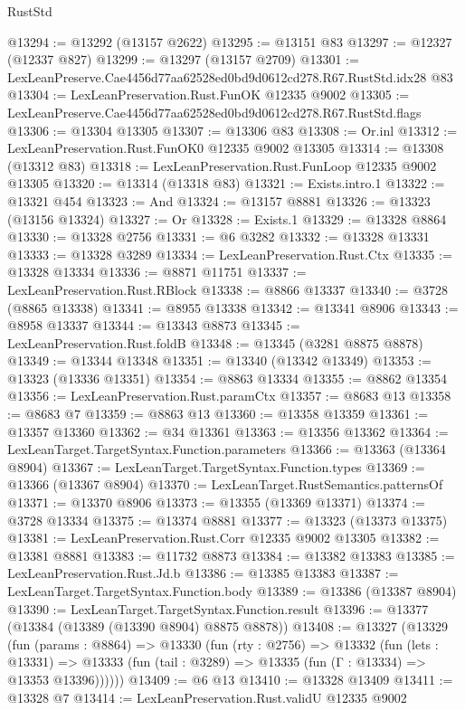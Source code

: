 \begin{lexlean}{RustStd}
\begin{coremodule}
@13294 := @13292 (@13157 @2622)
@13295 := @13151 @83
@13297 := @12327 (@12337 @827)
@13299 := @13297 (@13157 @2709)
@13301 := LexLeanPreserve.Cae4456d77aa62528ed0bd9d0612cd278.R67.RustStd.idx28 @83
@13304 := LexLeanPreservation.Rust.FunOK @12335 @9002
@13305 := LexLeanPreserve.Cae4456d77aa62528ed0bd9d0612cd278.R67.RustStd.flags
@13306 := @13304 @13305
@13307 := @13306 @83
@13308 := Or.inl
@13312 := LexLeanPreservation.Rust.FunOK0 @12335 @9002 @13305
@13314 := @13308 (@13312 @83)
@13318 := LexLeanPreservation.Rust.FunLoop @12335 @9002 @13305
@13320 := @13314 (@13318 @83)
@13321 := Exists.intro.{1}
@13322 := @13321 @454
@13323 := And
@13324 := @13157 @8881
@13326 := @13323 (@13156 @13324)
@13327 := Or
@13328 := Exists.{1}
@13329 := @13328 @8864
@13330 := @13328 @2756
@13331 := @6 @3282
@13332 := @13328 @13331
@13333 := @13328 @3289
@13334 := LexLeanPreservation.Rust.Ctx
@13335 := @13328 @13334
@13336 := @8871 @11751
@13337 := LexLeanPreservation.Rust.RBlock
@13338 := @8866 @13337
@13340 := @3728 (@8865 @13338)
@13341 := @8955 @13338
@13342 := @13341 @8906
@13343 := @8958 @13337
@13344 := @13343 @8873
@13345 := LexLeanPreservation.Rust.foldB
@13348 := @13345 (@3281 @8875 @8878)
@13349 := @13344 @13348
@13351 := @13340 (@13342 @13349)
@13353 := @13323 (@13336 @13351)
@13354 := @8863 @13334
@13355 := @8862 @13354
@13356 := LexLeanPreservation.Rust.paramCtx
@13357 := @8683 @13
@13358 := @8683 @7
@13359 := @8863 @13
@13360 := @13358 @13359
@13361 := @13357 @13360
@13362 := @34 @13361
@13363 := @13356 @13362
@13364 := LexLeanTarget.TargetSyntax.Function.parameters
@13366 := @13363 (@13364 @8904)
@13367 := LexLeanTarget.TargetSyntax.Function.types
@13369 := @13366 (@13367 @8904)
@13370 := LexLeanTarget.RustSemantics.patternsOf
@13371 := @13370 @8906
@13373 := @13355 (@13369 @13371)
@13374 := @3728 @13334
@13375 := @13374 @8881
@13377 := @13323 (@13373 @13375)
@13381 := LexLeanPreservation.Rust.Corr @12335 @9002 @13305
@13382 := @13381 @8881
@13383 := @11732 @8873
@13384 := @13382 @13383
@13385 := LexLeanPreservation.Rust.Jd.b
@13386 := @13385 @13383
@13387 := LexLeanTarget.TargetSyntax.Function.body
@13389 := @13386 (@13387 @8904)
@13390 := LexLeanTarget.TargetSyntax.Function.result
@13396 := @13377 (@13384 (@13389 (@13390 @8904) @8875 @8878))
@13408 := @13327
    (@13329
      (fun (params : @8864) =>
      @13330
        (fun (rty : @2756) =>
        @13332
          (fun (lets : @13331) =>
          @13333 (fun (tail : @3289) => @13335 (fun (Γ : @13334) => @13353 @13396))))))
@13409 := @6 @13
@13410 := @13328 @13409
@13411 := @13328 @7
@13414 := LexLeanPreservation.Rust.validU @12335 @9002

\end{coremodule}
\end{lexlean}
